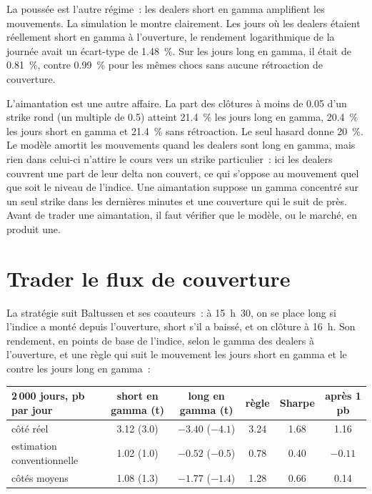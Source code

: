 La poussée est l'autre régime~: les dealers short en gamma amplifient les mouvements. La simulation le montre clairement. Les jours où les dealers étaient réellement short en gamma à
l'ouverture, le rendement logarithmique de la journée avait un écart-type de 1.48~\%. Sur les jours long en gamma, il était de 0.81~\%, contre 0.99~\% pour les mêmes chocs sans aucune
rétroaction de couverture.

L'aimantation est une autre affaire. La part des clôtures à moins de 0.05 d'un strike rond (un multiple de 0.5) atteint 21.4~\% les jours long en gamma, 20.4~\% les jours
short en gamma et 21.4~\% sans rétroaction. Le seul hasard donne 20~\%. Le modèle amortit les mouvements quand les dealers sont long en gamma, mais rien dans celui-ci n'attire le cours vers un
strike particulier~: ici les dealers couvrent une part de leur delta non couvert, ce qui s'oppose au mouvement quel que soit le niveau de l'indice. Une aimantation suppose un gamma
concentré sur un seul strike dans les dernières minutes et une couverture qui le suit de près. Avant de trader une aimantation, il faut vérifier que le modèle, ou le marché,
en produit une.

\section{Trader le flux de couverture}

La stratégie suit Baltussen et ses coauteurs~: à 15~h~30, on se place long si l'indice a monté depuis l'ouverture, short s'il a baissé, et on clôture à 16~h.
Son rendement, en points de base de l'indice, selon le gamma des dealers à l'ouverture, et une règle qui suit le mouvement les jours short en gamma et le
contre les jours long en gamma~:

\begin{center}
\small
\begin{tabular}{@{}lccccc@{}}
\toprule
2\,000 jours, pb par jour & short en gamma (t) & long en gamma (t) & règle & Sharpe & après 1 pb\\
\midrule
côté réel & 3.12 (3.0) & $-3.40$ ($-4.1$) & 3.24 & 1.68 & 1.16\\
estimation conventionnelle & 1.02 (1.0) & $-0.52$ ($-0.5$) & 0.78 & 0.40 & $-0.11$\\
côtés moyens & 1.08 (1.3) & $-1.77$ ($-1.4$) & 1.28 & 0.66 & 0.14\\
\bottomrule
\end{tabular}
\end{center}

